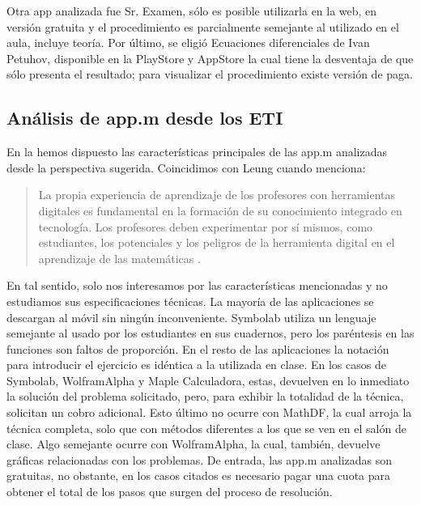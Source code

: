 \documentclass[spanish]{textolivre}
\begin{document}
Otra app analizada fue Sr. Examen, sólo es posible utilizarla en la web, en versión gratuita y el procedimiento es parcialmente semejante al utilizado en el aula, incluye teoría. Por último, se eligió Ecuaciones diferenciales de Ivan Petuhov, disponible en la PlayStore y AppStore la cual tiene la desventaja de que sólo presenta el resultado; para visualizar el procedimiento existe versión de paga. 

\subsection{Análisis de app.m desde los ETI}\label{sec-3.1}
En la  hemos dispuesto las características principales de las app.m analizadas desde la perspectiva sugerida. Coincidimos con Leung cuando menciona:

\begin{quote}
La propia experiencia de aprendizaje de los profesores con herramientas digitales es fundamental en la formación de su conocimiento integrado en tecnología. Los profesores deben experimentar por sí mismos, como estudiantes, los potenciales y los peligros de la herramienta digital en el aprendizaje de las matemáticas \cite[p. 6]{leung2017}.
\end{quote}

En tal sentido, solo nos interesamos por las características mencionadas y no estudiamos sus especificaciones técnicas. La mayoría de las aplicaciones se descargan al móvil sin ningún inconveniente. Symbolab utiliza un lenguaje semejante al usado por los estudiantes en sus cuadernos, pero los paréntesis en las funciones son faltos de proporción. En el resto de las aplicaciones la notación para introducir el ejercicio es idéntica a la utilizada en clase. En los casos de Symbolab, WolframAlpha y Maple Calculadora, estas, devuelven en lo inmediato la solución del problema solicitado, pero, para exhibir la totalidad de la técnica, solicitan un cobro adicional. Esto último no ocurre con MathDF, la cual arroja la técnica completa, solo que con métodos diferentes a los que se ven en el salón de clase. Algo semejante ocurre con WolframAlpha, la cual, también, devuelve gráficas relacionadas con los problemas. De entrada, las app.m analizadas son gratuitas, no obstante, en los casos citados es necesario pagar una cuota para obtener el total de los pasos que surgen del proceso de resolución.
\end{document}
